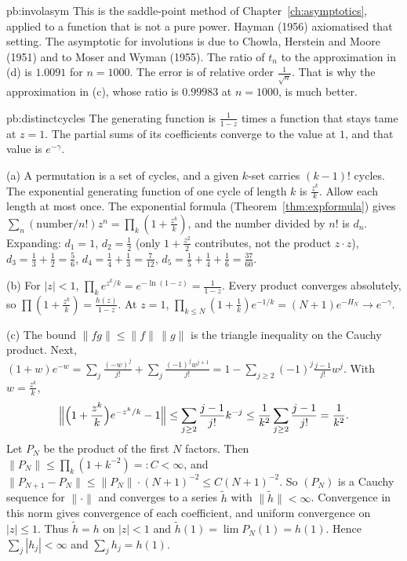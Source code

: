 \begin{solution}{pb:involasym}
\leads This is the saddle-point method of Chapter~\ref{ch:asymptotics}, applied to a function that is not a pure power. Hayman (1956) axiomatised that setting. The asymptotic for
involutions is due to Chowla, Herstein and Moore (1951) and to Moser and Wyman (1955). The ratio of $t_n$ to the approximation
in (d) is $1.0091$ for $n=1000$. The error is of relative order $\frac1{\sqrt n}$. That is why the approximation in (c), whose ratio is $0.99983$ at $n=1000$, is much better.
\end{solution}

\begin{solution}{pb:distinctcycles}
\idea The generating function is $\frac1{1-z}$ times a function that stays tame at $z=1$. The partial sums of its coefficients converge to the value at $1$, and that value
is $e^{-\gamma}$.

\writeup (a) A permutation is a set of cycles, and a given $k$-set carries $(k-1)!$ cycles. The exponential generating function of one cycle of length $k$
is $\frac{z^k}k$. Allow each length at most once. The exponential formula (Theorem~\ref{thm:expformula}) gives $\sum_n(\text{number}/n!)z^n=\prod_k(1+\frac{z^k}k)$, and the number divided
by $n!$ is $d_n$. Expanding: $d_1=1$, $d_2=\frac12$ (only $1+\frac{z^2}2$ contributes, not the product $z\cdot z$), $d_3=\frac13+\frac12=\frac56$, $d_4=\frac14+\frac13=\frac7{12}$, $d_5=\frac15+\frac14+\frac16=\frac{37}{60}$.

(b) For $|z|<1$, $\prod_ke^{z^k/k}=e^{-\ln(1-z)}=\frac1{1-z}$. Every product converges absolutely, so $\prod(1+\frac{z^k}k)=\frac{h(z)}{1-z}$. At $z=1$,
$\prod_{k\le N}(1+\frac1k)e^{-1/k}=(N+1)e^{-H_N}\to e^{-\gamma}$.

(c) The bound $\|fg\|\le\|f\|\,\|g\|$ is the triangle inequality on the Cauchy product. Next, $(1+w)e^{-w}=\sum_j\frac{(-w)^j}{j!}+\sum_j\frac{(-1)^jw^{j+1}}{j!}=1-\sum_{j\ge2}(-1)^j\frac{j-1}{j!}w^j$.
With $w=\frac{z^k}k$,
\[
\Bigl\|\Bigl(1+\frac{z^k}k\Bigr)e^{-z^k/k}-1\Bigr\|\le\sum_{j\ge2}\frac{j-1}{j!}k^{-j}\le\frac1{k^2}\sum_{j\ge2}\frac{j-1}{j!}=\frac1{k^2}.
\]
Let $P_N$ be the product of the first $N$ factors. Then $\|P_N\|\le\prod_k(1+k^{-2})=:C<\infty$, and $\|P_{N+1}-P_N\|\le\|P_N\|\cdot(N+1)^{-2}\le C(N+1)^{-2}$. So $(P_N)$ is a Cauchy
sequence for $\|\cdot\|$ and converges to a series $\tilde h$ with $\|\tilde h\|<\infty$. Convergence in this norm gives convergence of each coefficient, and uniform convergence on
$|z|\le1$. Thus $\tilde h=h$ on $|z|<1$ and $\tilde h(1)=\lim P_N(1)=h(1)$. Hence $\sum_j|h_j|<\infty$ and $\sum_jh_j=h(1)$.


\end{solution}
